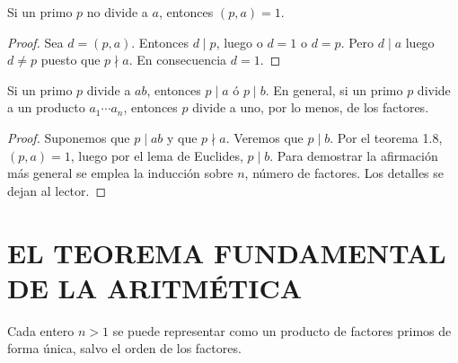 \documentclass[12pt,a4paper]{book}
\begin{document}
    \begin{teorema}
        Si un primo $p$ no divide a $a$, entonces $(p,a)=1$.
    \end{teorema}

    \begin{proof}
        Sea $d=(p,a)$. Entonces $d\mid p$, luego o $d=1$ o $d=p$. Pero $d\mid a$ luego
        $d\neq p$ puesto que $p\nmid a$. En consecuencia $d=1$.
    \end{proof}

    \begin{teorema}
        Si un primo $p$ divide a $ab$, entonces $p\mid a$ ó $p\mid b$. En general, si un
        primo $p$ divide a un producto $a_1\cdots a_n$, entonces $p$ divide a uno, por lo
        menos, de los factores.
    \end{teorema}

    \begin{proof}
        Suponemos que $p\mid ab$ y que $p\nmid a$. Veremos que $p\mid b$. Por el teorema 1.8,
        $(p,a)=1$, luego por el lema de Euclides, $p\mid b$. Para demostrar la afirmación más
        general se emplea la inducción sobre $n$, número de factores. Los detalles se dejan
        al lector.
    \end{proof}

    \section{EL TEOREMA FUNDAMENTAL DE LA ARITMÉTICA}

    \begin{teorema}
        Cada entero $n>1$ se puede representar como un producto de factores primos de forma
        única, salvo el orden de los factores.
    \end{teorema}
\end{document}
